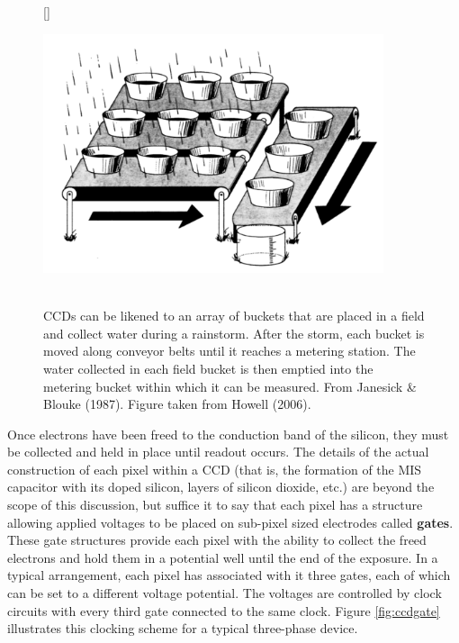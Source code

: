 \documentclass[a4paper,10pt]{article}
\begin{document}
\begin{figure}[t]
    [\FBwidth]
    {\caption{\footnotesize{\\CCDs can be likened to an array of buckets that are placed in a field and collect water during a rainstorm. After the storm, each bucket is moved along conveyor belts until it reaches a metering station. The water collected in each field bucket is then emptied into the metering bucket within which it can be measured. From Janesick \& Blouke (1987). Figure taken from Howell (2006).}}
    \label{fig:ccdoperation}}
    {\includegraphics[width=10cm]{figures/CCDoperation.png}}
\end{figure}

{\noindent}Once electrons have been freed to the conduction band of the silicon, they must be collected and held in place until readout occurs. The details of the actual construction of each pixel within a CCD (that is, the formation of the MIS capacitor with its doped silicon, layers of silicon dioxide, etc.) are beyond the scope of this discussion, but suffice it to say that each pixel has a structure allowing applied voltages to be placed on sub-pixel sized electrodes called \textbf{gates}. These gate structures provide each pixel with the ability to collect the freed electrons and hold them in a potential well until the end of the exposure. In a typical arrangement, each pixel has associated with it three gates, each of which can be set to a different voltage potential. The voltages are controlled by clock circuits with every third gate connected to the same clock. Figure \ref{fig:ccdgate} illustrates this clocking scheme for a typical three-phase device.
\end{document}

